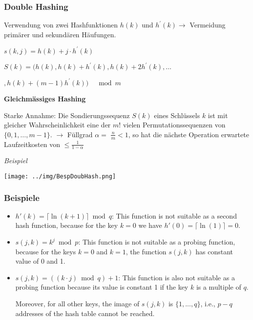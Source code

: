 \documentclass[german]{latex4ei/latex4ei_sheet}
\begin{document}
\begin{sectionbox}
\subsubsection{Double Hashing}\par\smallskip
Verwendung von zwei Hashfunktionen $h(k)$ und $h^{\prime}(k) \rightarrow$ Vermeidung primärer und sekundären Häufungen.
\begin{center}
    $s(k, j)=h(k)+j \cdot h^{\prime}(k)$\par
    $S(k)=(h(k), h(k)+h^{\prime}(k), h(k)+2 h^{\prime}(k), \ldots$ \par
    $, h(k)+(m-1) h^{\prime}(k)) \quad \bmod m$
\end{center}\par\smallskip

\textbf{Gleichmässiges Hashing}\par
Starke Annahme: Die Sondierungssequenz $S(k)$ eines Schlüssels $k$ ist mit gleicher Wahrscheinlichkeit eine der $m !$ vielen Permutationssequenzen von $\{0,1, \ldots, m-1\}$.
$\rightarrow$ Füllgrad $\alpha=$ $\frac{n}{m}<1$, so hat die nächste Operation erwartete Laufzeitkosten von $\leq \frac{1}{1-\alpha}$\par\smallskip
\textit{Beispiel}\par
\begin{center}
    \texttt{[image: ../img/BespDoubHash.png]}
\end{center}\vspace{7px}

\subsubsection{Beispiele}\par\smallskip
\begin{itemize}
    \item $h'(k) = \lceil \ln (k+1) \rceil \bmod q$: This function is not suitable as a second hash function, because for the key $k = 0$ we have $h'(0) = \lceil \ln (1) \rceil = 0$.
    \item $s(j,k) = k^j \bmod p$: This function is not suitable as a probing function, because for the keys $k = 0$ and $k = 1$, the function $s(j, k)$ has constant value of 0 and 1.
    \item $s(j,k) = ((k \cdot j) \bmod q) + 1$: This function is also not suitable as a probing function because its value is constant 1 if the key $k$ is a multiple of $q$.\par Moreover, for all other keys, the image of $s(j, k)$ is $\{1, . . . , q\}$, i.e., $p - q$ addresses of the hash table cannot be reached.
\end{itemize}

\end{sectionbox}
\end{document}
